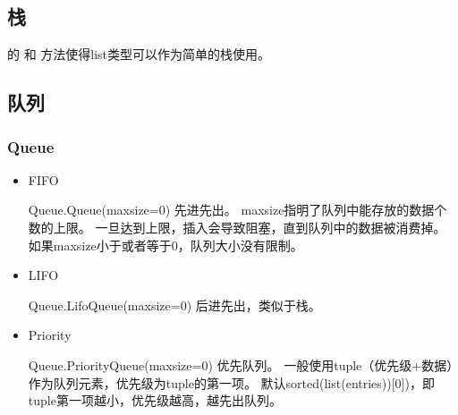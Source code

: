 \documentclass[letterpaper,10pt,english]{sphinxmanual}
\begin{document}
\subsection{栈}
\label{\detokenize{python/11_dataStruct:id2}}
 的  和  方法使得list类型可以作为简单的栈使用。


\subsection{队列}
\label{\detokenize{python/11_dataStruct:id3}}

\subsubsection{Queue}
\label{\detokenize{python/11_dataStruct:queue}}
%
\begin{sphinxVerbatim}[commandchars=\\\{\}]
 
\end{sphinxVerbatim}
\begin{itemize}
\item {} 
FIFO

%
\begin{sphinxVerbatim}[commandchars=\\\{\}]
Queue.Queue(maxsize=0)
先进先出。
maxsize指明了队列中能存放的数据个数的上限。
一旦达到上限，插入会导致阻塞，直到队列中的数据被消费掉。
如果maxsize小于或者等于0，队列大小没有限制。
\end{sphinxVerbatim}

\item {} 
LIFO

%
\begin{sphinxVerbatim}[commandchars=\\\{\}]
Queue.LifoQueue(maxsize=0)
后进先出，类似于栈。
\end{sphinxVerbatim}

\item {} 
Priority

%
\begin{sphinxVerbatim}[commandchars=\\\{\}]
Queue.PriorityQueue(maxsize=0)
优先队列。
一般使用tuple（优先级+数据）作为队列元素，优先级为tuple的第一项。
默认sorted(list(entries))[0])，即tuple第一项越小，优先级越高，越先出队列。
\end{sphinxVerbatim}

\end{itemize}
\end{document}
